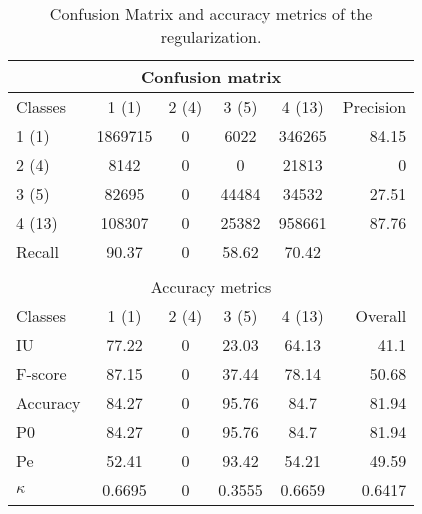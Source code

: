 \begin{table}[htbp]
\begin{center}
\begin{tabular}{|l|c|c|c|c|r|}
\hline
\multicolumn{6}{|c|}{Confusion matrix} \\
\hline
 Classes & 1 (1) & 2 (4) & 3 (5) & 4 (13) & Precision \\
\hline
1 (1) & 1869715 & 0 & 6022 & 346265 & 84.15 \\
\hline
2 (4) & 8142 & 0 & 0 & 21813 & 0 \\
\hline
3 (5) & 82695 & 0 & 44484 & 34532 & 27.51 \\
\hline
4 (13) & 108307 & 0 & 25382 & 958661 & 87.76 \\
\hline
Recall & 90.37 & 0 & 58.62 & 70.42 &  \\
\hline
\multicolumn{6}{c}{ } \\
\hline
\multicolumn{6}{|c|}{Accuracy metrics} \\
\hline
 Classes & 1 (1) & 2 (4) & 3 (5) & 4 (13) & Overall \\
\hline
IU & 77.22 & 0 & 23.03 & 64.13 & 41.1 \\
\hline
F-score & 87.15 & 0 & 37.44 & 78.14 & 50.68 \\
\hline
Accuracy & 84.27 & 0 & 95.76 & 84.7 & 81.94 \\
\hline
P0 & 84.27 & 0 & 95.76 & 84.7 & 81.94 \\
\hline
Pe & 52.41 & 0 & 93.42 & 54.21 & 49.59 \\
\hline
$\kappa$ & 0.6695 & 0 & 0.3555 & 0.6659 & 0.6417 \\
\hline
\end{tabular}
\caption{Confusion Matrix and accuracy metrics of the regularization.}
\end{center}
\end{table}